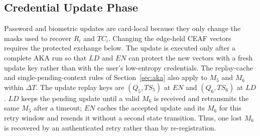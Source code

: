 \documentclass[cmc,article,submit,moreauthors,pdftex]{Definitions/tsp}
\begin{document}
\endgroup

\subsection{Credential Update Phase}\label{sec:update}

Password and biometric updates are card-local because they only change the masks used to recover $R_i$ and $TC_i$. Changing the edge-held CEAF vectors requires the protected exchange below. The update is executed only after a complete AKA run so that $LD$ and $EN$ can protect the new vectors with a fresh update key rather than with the user's low-entropy credentials.
The replay-cache and single-pending-context rules of Section~\ref{sec:aka} also apply to $M_5$ and $M_6$ within $\Delta T$. The update replay keys are $(Q_5,TS_5)$ at $EN$ and $(Q_6,TS_6)$ at $LD$. $LD$ keeps the pending update until a valid $M_6$ is received and retransmits the same $M_5$ after a timeout; $EN$ caches the accepted update and its $M_6$ for this retry window and resends it without a second state transition. Thus, one lost $M_6$ is recovered by an authenticated retry rather than by re-registration.
\end{document}
